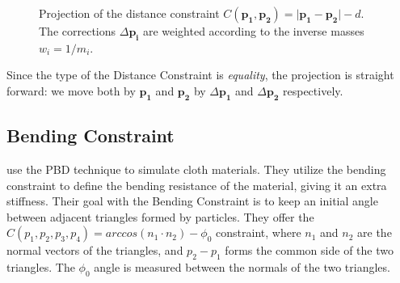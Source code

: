 \documentclass[sigplan,screen,nonacm]{acmart}
\renewcommand{\b}{\boldsymbol}
\begin{document}
\begin{figure}
    \label{fig:dist_constr_proj}
    \caption{Projection of the distance constraint $C(\b{p_1}, \b{p_2}) = \lvert \b{p_1}
    - \b{p_2} \rvert - d$. The corrections $\Delta \b{p_i}$ are weighted according
    to the inverse masses $w_i = 1/m_i$.}
\end{figure}

Since the type of the Distance Constraint is \emph{equality}, the projection is
straight forward: we move both by $\b{p_1}$ and $\b{p_2}$ by $\Delta \b{p_1}$ and
$\Delta \b{p_2}$ respectively.

\subsection{Bending Constraint} \label{section:bendingConstraint}
\citet{UmenhofferSimulation} use the PBD technique to simulate cloth materials.
They utilize the bending constraint to define the bending resistance of the
material, giving it an extra stiffness. Their goal with the Bending Constraint
is to keep an initial angle between adjacent triangles formed by particles. They
offer the $C(p_1,p_2,p_3,p_4) = arccos(n_1 \cdot n_2) - \phi _0$ constraint,
where $n_1$ and $n_2$ are the normal vectors of the triangles, and $p_2 - p_1$
forms the common side of the two triangles. The $\phi _0$ angle is measured
between the normals of the two triangles.
\end{document}
